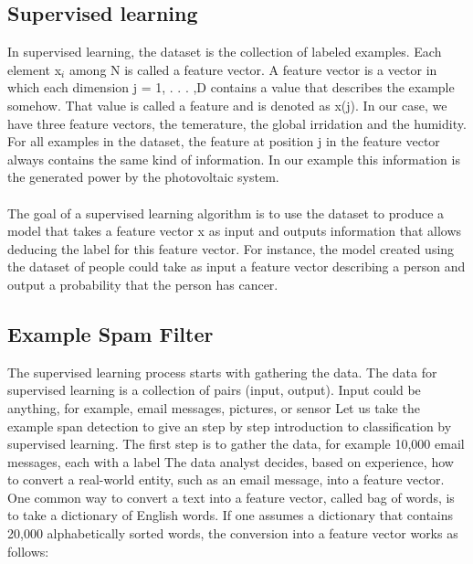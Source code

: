 \subsection{Supervised learning}

In supervised learning, the dataset is the collection of labeled examples. Each element x$_{i}$ among N is called a feature vector. A feature vector is a vector in which each dimension j = 1, . . . ,D contains a value that describes the example somehow. That value is called a feature and is denoted as x(j). In our case, we have three feature vectors, the temerature, the global irridation and the humidity. For all examples in the dataset, the feature at position j in the feature vector always contains the same kind of information. In our example this information is the generated power by the photovoltaic system. \\
\\

The goal of a supervised learning algorithm is to use the dataset to produce a model that takes a feature vector x as input and outputs information that allows deducing the label for this feature vector. For instance, the model created using the dataset of people could take as input a feature vector describing a person and output a probability that the person has cancer. \cite{thehundrerpageMLbook}

\subsection*{Example Spam Filter}
\label{subsec:SVM_Spam}

The supervised learning process starts with gathering the data. The data for supervised learning is a collection of pairs (input, output). Input could be anything, for example, email messages, pictures, or sensor %
Let us take the example span detection to give an step by step introduction to classification by supervised learning. The first step is to gather the data, for example 10,000 email messages, each with a label %
The data analyst decides, based on experience, how to convert a real-world entity, such as an email message, into a feature vector. One common way to convert a text into a feature vector, called bag of words, is to take a dictionary of English words. If one assumes a dictionary that contains 20,000 alphabetically sorted words, the conversion into a feature vector works as follows: 


